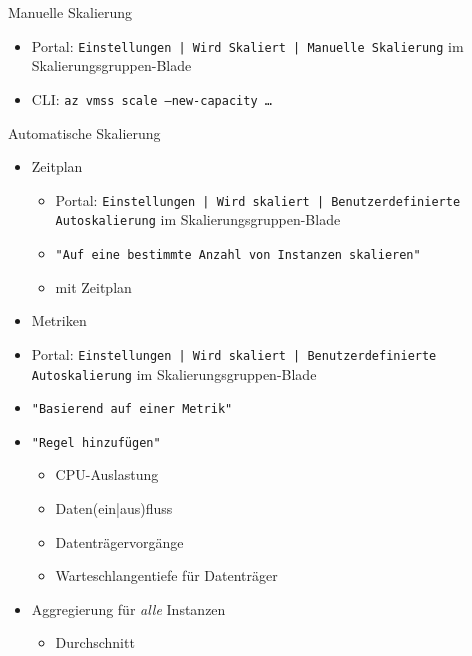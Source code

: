 \begin{flashcard}[Definition]{Manuelle Skalierung}
    \begin{itemize}
        \item Portal: \texttt{Einstellungen | Wird Skaliert | Manuelle Skalierung} im Skalierungsgruppen-Blade
        \item CLI: \texttt{az vmss scale --new-capacity \ldots}
    \end{itemize}
\end{flashcard}

\begin{flashcard}[Definition]{Automatische Skalierung}
    \begin{itemize}
        \item Zeitplan
            \begin{itemize}
                \item Portal: \texttt{Einstellungen | Wird skaliert | Benutzerdefinierte Autoskalierung} im Skalierungsgruppen-Blade
                \item \texttt{"Auf eine bestimmte Anzahl von Instanzen skalieren"}
                \item mit Zeitplan
            \end{itemize}
        \item Metriken
            \item Portal: \texttt{Einstellungen | Wird skaliert | Benutzerdefinierte Autoskalierung} im Skalierungsgruppen-Blade
            \item \texttt{"Basierend auf einer Metrik"}
            \item \texttt{"Regel hinzufügen"}
            \begin{itemize}
                \item CPU-Auslastung
                \item Daten(ein|aus)fluss
                \item Datenträgervorgänge
                \item Warteschlangentiefe für Datenträger
            \end{itemize}
        \item Aggregierung für \emph{alle} Instanzen
            \begin{itemize}
                \item Durchschnitt

\end{itemize}
\end{itemize}
\end{flashcard}
